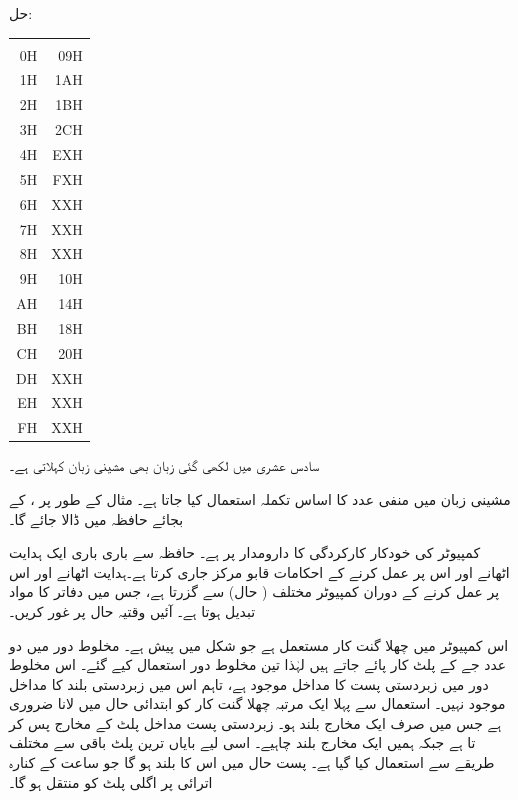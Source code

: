 حل:\quad
\begin{center}
\begin{tabular}{RR}
& \\[0.5ex]
0H&09H \\
1H&1AH\\
2H&1BH\\
3H&2CH\\
4H&EXH\\
5H&FXH\\
6H&XXH\\
7H&XXH\\
8H&XXH\\
9H&10H\\
AH&14H\\
BH&18H\\
CH&20H\\
DH&XXH\\
EH&XXH\\
FH&XXH
\end{tabular}
\end{center}
سادس عشری  میں لکھی گئی زبان بھی مشینی زبان کہلاتی ہے۔

  مشینی زبان میں منفی عدد کا اساس  تکملہ  استعمال کیا جاتا ہے۔ مثال کے طور پر ،   کے بجائے  حافظہ میں ڈالا جائے گا۔

کمپیوٹر کی خودکار کارکردگی کا دارومدار  پر ہے۔ حافظہ سے باری باری ایک  ہدایت    اٹھانے اور اس پر عمل کرنے  کے  احکامات قابو مرکز جاری کرتا ہے۔ہدایت  اٹھانے اور اس پر عمل کرنے کے دوران کمپیوٹر مختلف  ( حال)   سے گزرتا ہے، جس میں دفاتر  کا  مواد  تبدیل ہوتا ہے۔ آئیں وقتیہ حال پر غور کریں۔

اس کمپیوٹر میں  چھلا گنت کار  مستعمل ہے جو شکل  میں پیش ہے۔ مخلوط دور  میں دو عدد جے کے پلٹ کار  پائے جاتے ہیں لہٰذا تین مخلوط دور استعمال کیے گئے۔ اس  مخلوط دور میں زبردستی پست   کا مداخل موجود ہے، تاہم اس میں زبردستی بلند کا مداخل موجود نہیں۔  استعمال سے پہلا ایک مرتبہ  چھلا گنت کار کو ابتدائی حال میں لانا ضروری ہے جس میں صرف ایک مخارج بلند ہو۔  زبردستی پست مداخل پلٹ کے   مخارج پس کر تا ہے جبکہ ہمیں ایک مخارج بلند چاہیے۔ اسی لیے  بایاں ترین پلٹ باقی سے مختلف طریقے سے استعمال کیا گیا ہے۔ پست حال میں اس کا  بلند ہو گا جو ساعت کے کنارہ اترائی پر اگلی پلٹ کو منتقل ہو گا۔


